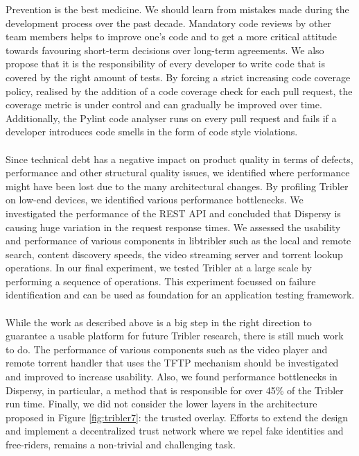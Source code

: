 Prevention is the best medicine. We should learn from mistakes made during the development process over the past decade. Mandatory code reviews by other team members helps to improve one's code and to get a more critical attitude towards favouring short-term decisions over long-term agreements. We also propose that it is the responsibility of every developer to write code that is covered by the right amount of tests. By forcing a strict increasing code coverage policy, realised by the addition of a code coverage check for each pull request, the coverage metric is under control and can gradually be improved over time. Additionally, the Pylint code analyser runs on every pull request and fails if a developer introduces code smells in the form of code style violations.\\\\
Since technical debt has a negative impact on product quality in terms of defects, performance and other structural quality issues, we identified where performance might have been lost due to the many architectural changes. By profiling Tribler on low-end devices, we identified various performance bottlenecks. We investigated the performance of the REST API and concluded that Dispersy is causing huge variation in the request response times. We assessed the usability and performance of various components in libtribler such as the local and remote search, content discovery speeds, the video streaming server and torrent lookup operations. In our final experiment, we tested Tribler at a large scale by performing a sequence of operations. This experiment focussed on failure identification and can be used as foundation for an application testing framework.\\\\
While the work as described above is a big step in the right direction to guarantee a usable platform for future Tribler research, there is still much work to do. The performance of various components such as the video player and remote torrent handler that uses the TFTP mechanism should be investigated and improved to increase usability. Also, we found performance bottlenecks in Dispersy, in particular, a method that is responsible for over 45\% of the Tribler run time. Finally, we did not consider the lower layers in the architecture proposed in Figure \ref{fig:tribler7}: the trusted overlay. Efforts to extend the design and implement a decentralized trust network where we repel fake identities and free-riders, remains a non-trivial and challenging task.

